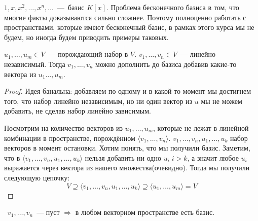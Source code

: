 \begin{example}
    $1, x, x^2, \dots, x^n, \dots$~---~базис $K[x]$. 
    Проблема бесконечного базиса в том, что многие факты доказываются сильно сложнее.
    Поэтому полноценно работать с пространствами, которые имеют бесконечный базис, в рамках этого
    курса мы не будем, но иногда будем приводить примеры таковых.
\end{example}
\begin{theorem}
    $u_1,\dots,u_m\in V$~--- порождающий набор в $V$. $v_1,\dots,v_n\in V$~---
    линейно независимый. Тогда $v_1,\dots, v_n$ можно дополнить до базиса добавив
    какие-то вектора из $u_1\dots, u_m$.
\end{theorem}
\begin{proof}
Идея банальна: добавляем по одному и в какой-то момент мы достигнем того, что набор
линейно независимым, но ни один вектор из $u$ мы не можем добавить, не сделав набор
линейно зависимым.

Посмотрим на количество векторов из $u_1,\dots, u_m$, которые не
лежат в линейной комбинации в пространстве, порождённом $\langle  v_1,\dots, v_n\rangle$.
$v_1,\dots,v_n, u_1,\dots, u_k$ набор векторов в момент остановки. Хотим понять, что
мы получили базис.
Заметим, что в $\langle v_1,\dots,v_n,u_1,\dots,u_k\rangle$ нельзя добавить ни одно $u_i\; i > k$, а значит
любое $u_i$ выражается через вектора из нашего множества(очевидно). Тогда мы получили
следующую цепочку:
$$V\supseteq \langle v_1,\dots,v_n, u_1,\dots,u_k\rangle \supseteq \langle u_1,\dots,u_m\rangle=V$$
\end{proof}
\follow~$v_1,\dots,v_n$~--- пуст $\Rightarrow$ в любом векторном пространстве есть базис.
